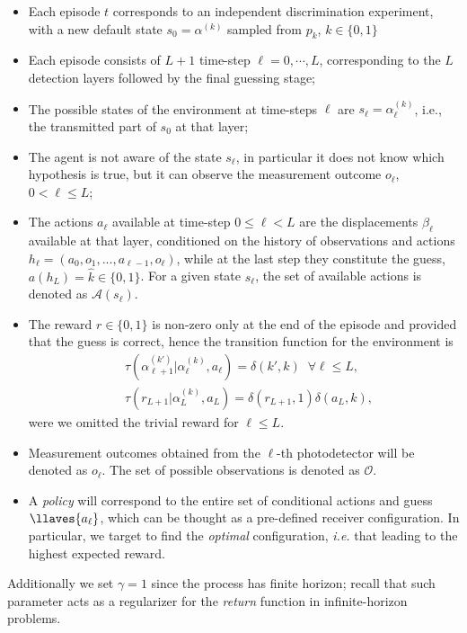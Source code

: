 \begin{itemize}
\item Each episode $t$ corresponds to an independent discrimination experiment, with a new default state $s_{0}=\alpha^{(k)}$ sampled from $p_{k}$, $k\in\{0,1\}$
\item Each episode consists of $L+1$ time-step $\ell=0,\cdots,L$, corresponding to the $L$ detection layers followed by the final guessing stage;
\item The possible states of the environment at time-steps $\ell$ are $s_{\ell}=\alpha^{(k)}_{\ell}$, i.e., the transmitted part of $s_{0}$ at that layer;
\item The agent is not aware of the state $s_{\ell}$, in particular it does not know which hypothesis is true, but it can observe the measurement outcome $o_{\ell}$, $0 < \ell \leq L$;
\item The actions $a_\ell$ available at time-step $0 \leq \ell <L$ are the displacements $\beta_{\ell}$ available at that layer, conditioned on the history of observations and actions $h_{\ell}=(a_0, o_1, ...,a_{\ell-1},o_\ell)$, while at the last step they constitute the guess, $a(h_{L})=\hat{k}\in\{0,1\}$. For a given state $s_\ell$, the set of available actions is denoted as $\mathcal{A}(s_{\ell})$.
\item The reward $r\in\{0,1\}$ is non-zero only at the end of the episode and provided that the guess is correct, hence the transition function for the environment is
\begin{align}
\label{eq:sTr}&\tau(\alpha^{(k')}_{\ell+1}|\alpha^{(k)}_\ell,a_{\ell})=\delta(k',k)\;\;\forall\ell\leq L,\\
&\tau(r_{L+1}|\alpha^{(k)}_L,a_L)=\delta(r_{L+1},1)\delta(a_L,k),
\end{align}
were we omitted the trivial reward for $\ell\leq L$.
\item Measurement outcomes obtained from the $\ell$-th photodetector will be denoted as $o_\ell$. The set of possible observations is denoted as $\mathcal{O}$.
\item A \textit{policy} will correspond to the entire set of conditional actions and guess $\llaves{a_\ell}$, which can be thought as a pre-defined receiver configuration. In particular, we target to find the \textit{optimal} configuration, \textit{i.e.} that leading to the highest expected reward.
\end{itemize}
Additionally we set $\gamma=1$ since the process has finite horizon; recall that such parameter acts as a regularizer for the \textit{return} function in infinite-horizon problems.

